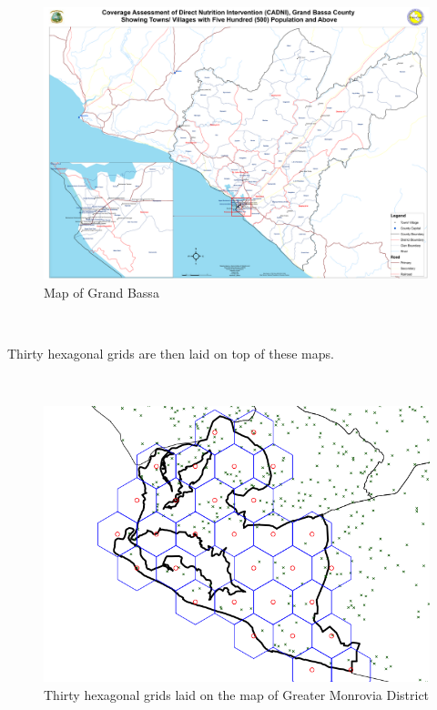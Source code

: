 \documentclass[12pt,a4paper]{book}
\theoremstyle{definition}
\theoremstyle{definition}
\theoremstyle{definition}
\theoremstyle{remark}
\begin{document}
~

\begin{figure}[H]

{\centering \includegraphics[width=0.8\linewidth]{figures/grandBassaEA} 

}

\caption{Map of Grand Bassa}\label{fig:sample21}
\end{figure}

~

Thirty hexagonal grids are then laid on top of these maps.

~

\begin{figure}[H]

{\centering \includegraphics{figures/sample22-1} 

}

\caption{Thirty hexagonal grids laid on the  map of Greater Monrovia District}\label{fig:sample22}
\end{figure}
\end{document}
